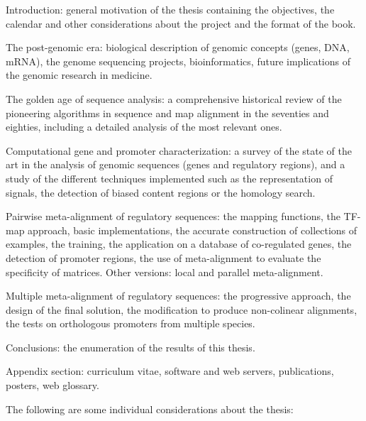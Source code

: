 \begin{menumerate}
\item Introduction: general motivation of the thesis containing the objectives, the calendar
and other considerations about the project and the format of the book.

\item The post-genomic era: biological description of genomic concepts (genes, DNA, mRNA), 
the genome sequencing projects, bioinformatics, future implications of the genomic research in medicine.

\item The golden age of sequence analysis: a comprehensive historical review of the pioneering algorithms 
in sequence and map alignment in the seventies and eighties, including a detailed analysis of the most 
relevant ones.

\item Computational gene and promoter characterization: a survey of the state of the art in the
analysis of genomic sequences (genes and regulatory regions), and a study of the different techniques
implemented such as the representation of signals, the detection of biased content regions or the
homology search.

\item Pairwise meta-alignment of regulatory sequences: the mapping functions, the TF-map approach,
basic implementations, the accurate construction of collections of examples, the training, the application
on a database of co-regulated genes, the detection of promoter regions, the use of meta-alignment to 
evaluate the specificity of matrices. Other versions: local and parallel meta-alignment.

\item Multiple meta-alignment of regulatory sequences: the progressive approach, the design of the final 
solution, the modification to produce non-colinear alignments, the tests on orthologous promoters from 
multiple species.

\item Conclusions: the enumeration of the results of this thesis.

\item Appendix section: curriculum vitae, software and web servers, publications, posters, web glossary.

\end{menumerate}



The following are some individual considerations about the thesis:


